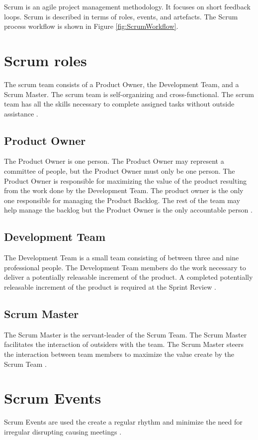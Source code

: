 Scrum is an agile project management methodology. It focuses on short feedback
loops. Scrum is described in terms of roles, events, and artefacts. The Scrum 
process workflow is shown in Figure \ref{fig:ScrumWorkflow}.

\section{Scrum roles}
The scrum team consists of a Product Owner, the Development Team, and a Scrum Master.
The scrum team is self-organizing and cross-functional. The scrum team has all the skills 
necessary to complete assigned tasks without outside assistance \parencite{TheScrumGuide}.

\subsection{Product Owner}
The Product Owner is one person. The Product Owner may represent a committee of people, 
but the Product Owner must only be one person. The Product Owner is responsible 
for maximizing the value of the product resulting from the work done by the 
Development Team. The product owner is the only one responsible for managing the
Product Backlog. The rest of the team may help manage the backlog but the 
Product Owner is the only accountable person  \parencite{TheScrumGuide}.

\subsection{Development Team}
The Development Team is a small team consisting of between three and nine 
professional people. The Development Team members do the work necessary to 
deliver a potentially releasable increment of the product. A completed potentially
releasable increment of the product is required at the Sprint Review  \parencite{TheScrumGuide}.

\subsection{Scrum Master}
The Scrum Master is the servant-leader of the Scrum Team. The Scrum Master 
facilitates the interaction of outsiders with the team. The Scrum Master steers 
the interaction between team members to maximize the value create by the 
Scrum Team  \parencite{TheScrumGuide}.

\section{Scrum Events}
Scrum Events are used the create a regular rhythm and minimize the need for 
irregular disrupting causing meetings  \parencite{TheScrumGuide}.

